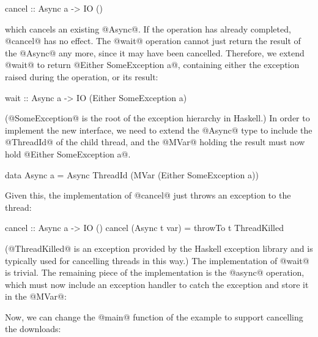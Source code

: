 \begin{haskell}
cancel :: Async a -> IO ()
\end{haskell}

\noindent which cancels an existing @Async@.  If the operation has
already completed, @cancel@ has no effect.  The @wait@ operation
cannot just return the result of the @Async@ any more, since it may
have been cancelled.  Therefore, we extend @wait@ to return
@Either SomeException a@, containing either the exception raised during the
operation, or its result:

\begin{haskell}
wait :: Async a -> IO (Either SomeException a)
\end{haskell}

\noindent (@SomeException@ is the root of the exception hierarchy in Haskell.)
In order to implement the new interface, we need to extend the @Async@
type to include the @ThreadId@ of the child thread, and the @MVar@
holding the result must now hold @Either SomeException a@.

\begin{haskell}
data Async a = Async ThreadId (MVar (Either SomeException a))
\end{haskell}

\noindent Given this, the implementation of @cancel@ just throws an
exception to the thread:

\begin{haskell}
cancel :: Async a -> IO ()
cancel (Async t var) = throwTo t ThreadKilled
\end{haskell}

\noindent (@ThreadKilled@ is an exception provided by the Haskell exception
library and is typically used for cancelling threads in this way.)
The implementation of @wait@ is trivial.
The remaining piece of the implementation is the @async@ operation,
which must now include an exception handler to catch the exception and
store it in the @MVar@:


Now, we can change the @main@ function of the example to support
cancelling the downloads:


